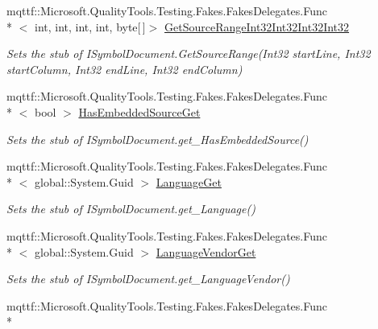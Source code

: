\begin{DoxyCompactItemize}
mqttf\-::\-Microsoft.\-Quality\-Tools.\-Testing.\-Fakes.\-Fakes\-Delegates.\-Func\\*
$<$ int, int, int, int, byte\mbox{[}$\,$\mbox{]}$>$ \hyperlink{class_system_1_1_diagnostics_1_1_symbol_store_1_1_fakes_1_1_stub_i_symbol_document_a7ecafccf42193dec6f30638c96766f08}{Get\-Source\-Range\-Int32\-Int32\-Int32\-Int32}
\begin{DoxyCompactList}\small\item\em Sets the stub of I\-Symbol\-Document.\-Get\-Source\-Range(\-Int32 start\-Line, Int32 start\-Column, Int32 end\-Line, Int32 end\-Column)\end{DoxyCompactList}\item 
mqttf\-::\-Microsoft.\-Quality\-Tools.\-Testing.\-Fakes.\-Fakes\-Delegates.\-Func\\*
$<$ bool $>$ \hyperlink{class_system_1_1_diagnostics_1_1_symbol_store_1_1_fakes_1_1_stub_i_symbol_document_a6fe81dd88b126c8825d5e747984d6373}{Has\-Embedded\-Source\-Get}
\begin{DoxyCompactList}\small\item\em Sets the stub of I\-Symbol\-Document.\-get\-\_\-\-Has\-Embedded\-Source()\end{DoxyCompactList}\item 
mqttf\-::\-Microsoft.\-Quality\-Tools.\-Testing.\-Fakes.\-Fakes\-Delegates.\-Func\\*
$<$ global\-::\-System.\-Guid $>$ \hyperlink{class_system_1_1_diagnostics_1_1_symbol_store_1_1_fakes_1_1_stub_i_symbol_document_af247a6c072ca8d17a922b35ecab88912}{Language\-Get}
\begin{DoxyCompactList}\small\item\em Sets the stub of I\-Symbol\-Document.\-get\-\_\-\-Language()\end{DoxyCompactList}\item 
mqttf\-::\-Microsoft.\-Quality\-Tools.\-Testing.\-Fakes.\-Fakes\-Delegates.\-Func\\*
$<$ global\-::\-System.\-Guid $>$ \hyperlink{class_system_1_1_diagnostics_1_1_symbol_store_1_1_fakes_1_1_stub_i_symbol_document_a924d91e07f09d148a2ed6d4e7fa42e92}{Language\-Vendor\-Get}
\begin{DoxyCompactList}\small\item\em Sets the stub of I\-Symbol\-Document.\-get\-\_\-\-Language\-Vendor()\end{DoxyCompactList}\item 
mqttf\-::\-Microsoft.\-Quality\-Tools.\-Testing.\-Fakes.\-Fakes\-Delegates.\-Func\\*

\end{DoxyCompactItemize}
